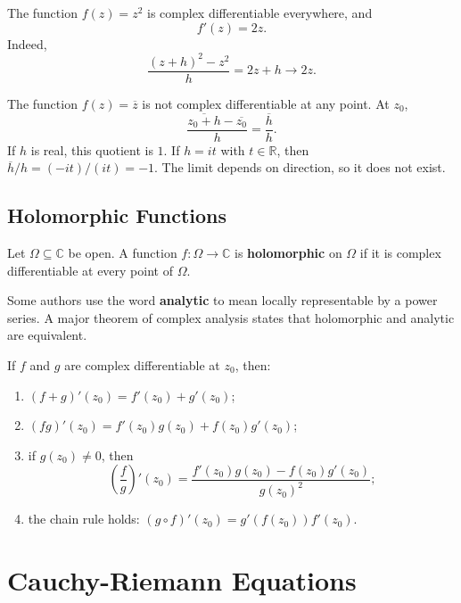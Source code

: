 \begin{example}
The function $f(z)=z^2$ is complex differentiable everywhere, and
\[
    f'(z)=2z.
\]
Indeed,
\[
    \frac{(z+h)^2-z^2}{h}=2z+h\to 2z.
\]
\end{example}

\begin{example}
The function $f(z)=\overline{z}$ is not complex differentiable at any point. At $z_0$,
\[
    \frac{\overline{z_0+h}-\overline{z_0}}{h}=\frac{\overline{h}}{h}.
\]
If $h$ is real, this quotient is $1$. If $h=it$ with $t\in\mathbb{R}$, then $\overline{h}/h=(-it)/(it)=-1$. The limit depends on direction, so it does not exist.
\end{example}

\subsection{Holomorphic Functions}

\begin{definition}
Let $\Omega\subseteq\mathbb{C}$ be open. A function $f:\Omega\to\mathbb{C}$ is \textbf{holomorphic} on $\Omega$ if it is complex differentiable at every point of $\Omega$.
\end{definition}

Some authors use the word \textbf{analytic} to mean locally representable by a power series. A major theorem of complex analysis states that holomorphic and analytic are equivalent.

\begin{proposition}
If $f$ and $g$ are complex differentiable at $z_0$, then:
\begin{enumerate}
    \item $(f+g)'(z_0)=f'(z_0)+g'(z_0)$;
    \item $(fg)'(z_0)=f'(z_0)g(z_0)+f(z_0)g'(z_0)$;
    \item if $g(z_0)\neq 0$, then
    \[
        \left(\frac{f}{g}\right)'(z_0)=\frac{f'(z_0)g(z_0)-f(z_0)g'(z_0)}{g(z_0)^2};
    \]
    \item the chain rule holds: $(g\circ f)'(z_0)=g'(f(z_0))f'(z_0)$.
\end{enumerate}
\end{proposition}

\section{Cauchy-Riemann Equations}

